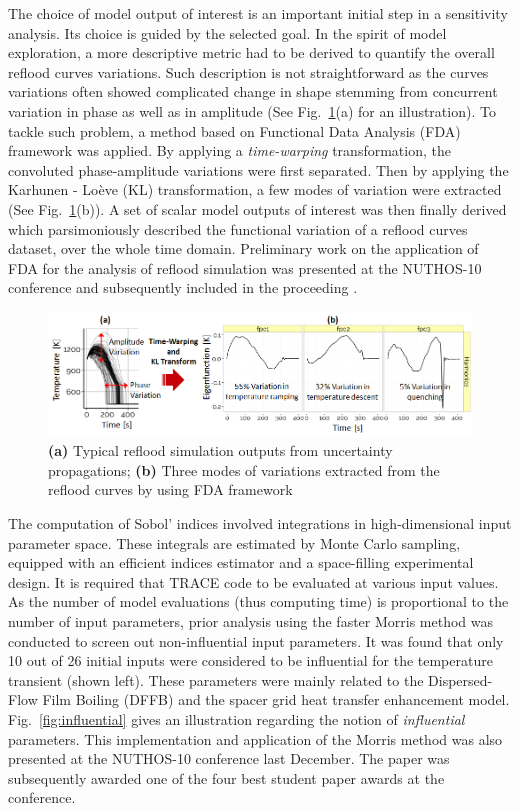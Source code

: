 \documentclass[11pt,titlepage]{article}
\begin{document}
The choice of model output of interest is an important initial step in a sensitivity analysis. Its choice is guided by the selected goal.
In the spirit of model exploration, a more descriptive metric had to be derived to quantify the overall reflood curves variations.
Such description is not straightforward as the curves variations often showed complicated change in shape stemming from concurrent variation in phase as well as in amplitude (See Fig.~\ref{fig:output}(a) for an illustration).
To tackle such problem, a method based on Functional Data Analysis (FDA) framework was applied.
By applying a \emph{time-warping} transformation, the convoluted phase-amplitude variations were first separated. Then by applying the Karhunen - Lo\`eve (KL) transformation, a few modes of variation were extracted (See Fig.~\ref{fig:output}(b)).
A set of scalar model outputs of interest was then finally derived which parsimoniously described the functional variation of a reflood curves dataset, over the whole time domain.
Preliminary work on the application of FDA for the analysis of reflood simulation was presented at the NUTHOS-10 conference and subsequently included in the proceeding \cite{Wicaksono2014a}.

\begin{figure}[h!]
	\centering
		\includegraphics[scale=0.63]{figures/modelOutputsOfInterest.png}
	\caption{\textbf{(a)} Typical reflood simulation outputs from uncertainty propagations; \textbf{(b)} Three modes of variations extracted from the reflood curves by using FDA framework}
	\label{fig:output}
\end{figure}

The computation of Sobol' indices involved integrations in high-dimensional input parameter space.
These integrals are estimated by Monte Carlo sampling, equipped with an efficient indices estimator and a space-filling experimental design.
It is required that TRACE code to be evaluated at various input values.
As the number of model evaluations (thus computing time) is proportional to the number of input parameters, prior analysis using the faster Morris method was conducted to screen out non-influential input parameters. It was found that only 10 out of 26 initial inputs were considered to be influential for the temperature transient (shown left). 
These parameters were mainly related to the Dispersed-Flow Film Boiling (DFFB) and the spacer grid heat transfer enhancement model.
Fig.~\ref{fig:influential} gives an illustration regarding the notion of \emph{influential} parameters.
This implementation and application of the Morris method was also presented at the NUTHOS-10 conference last December\cite{Wicaksono2014b}.
The paper was subsequently awarded one of the four best student paper awards at the conference.
\end{document}

